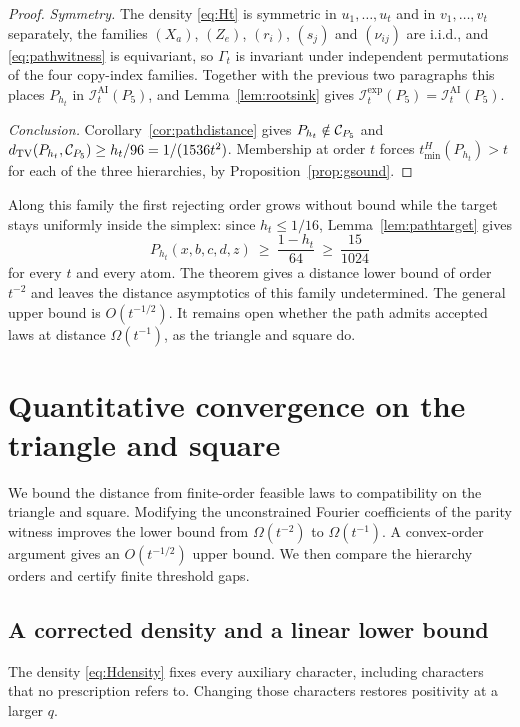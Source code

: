 \documentclass[11pt]{article}
\theoremstyle{plain}
\theoremstyle{definition}
\DeclareMathOperator{\TV}{TV}
\newcommand{\IAI}{\mathcal I^{\mathrm{AI}}}
\newcommand{\Iexp}{\mathcal I^{\mathrm{exp}}}
\newcommand{\tmin}{t_{\min}}
\begin{document}
\begin{proof}
\emph{Symmetry.} The density \eqref{eq:Ht} is symmetric in $u_1,\dots,u_t$ and in $v_1,\dots,v_t$ separately, the families $(X_a)$, $(Z_e)$, $(r_i)$, $(s_j)$ and $(\nu_{ij})$ are i.i.d., and \eqref{eq:pathwitness} is equivariant, so $\Gamma_t$ is invariant under independent permutations of the four copy-index families. Together with the previous two paragraphs this places $P_{h_t}$ in $\IAI_t(P_5)$, and Lemma~\ref{lem:rootsink} gives $\Iexp_t(P_5)=\IAI_t(P_5)$.

\emph{Conclusion.} Corollary~\ref{cor:pathdistance} gives $P_{h_t}\notin\mathcal C_{P_5}$ and
$d_{\TV}(P_{h_t},\Cpath)\ge h_t/96=1/(1536t^2)$. Membership at order $t$ forces $\tmin^H(P_{h_t})>t$ for each of the three hierarchies, by Proposition~\ref{prop:gsound}.
\end{proof}

Along this family the first rejecting order grows without bound while the target stays uniformly inside the simplex: since $h_t\le1/16$, Lemma~\ref{lem:pathtarget} gives
\[
P_{h_t}(x,b,c,d,z)\ \ge\ \frac{1-h_t}{64}\ \ge\ \frac{15}{1024}
\]
for every $t$ and every atom. The theorem gives a distance lower bound of order $t^{-2}$ and leaves the distance asymptotics of this family undetermined. The general upper bound is $O(t^{-1/2})$. It remains open whether the path admits accepted laws at distance $\Omega(t^{-1})$, as the triangle and square do.


\section{Quantitative convergence on the triangle and square}\label{sec:cyclequant}

We bound the distance from finite-order feasible laws to compatibility on the triangle and square. Modifying the unconstrained Fourier coefficients of the parity witness improves the lower bound from $\Omega(t^{-2})$ to $\Omega(t^{-1})$. A convex-order argument gives an $O(t^{-1/2})$ upper bound. We then compare the hierarchy orders and certify finite threshold gaps.

\subsection{A corrected density and a linear lower bound}\label{sec:corrected}

The density \eqref{eq:Hdensity} fixes every auxiliary character, including characters that no prescription refers to. Changing those characters restores positivity at a larger $q$.
\end{document}
